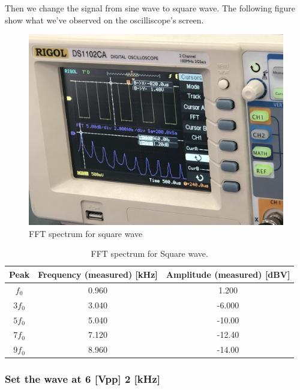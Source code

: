 \documentclass{article}
\begin{document}
Then we change the signal from sine wave to square wave. The following figure show what we've observed on the oscilliscope's screen.
  \begin{figure}[H]
  \centering
  \includegraphics[width=.6\textwidth]{Figure6.jpg}
  \caption{FFT spectrum for square wave}
  \label{img} 
\end{figure}

\begin{table}[H]

\begin{center}

\begin{tabular}{|c|c|c|}

\hline

Peak & Frequency (measured) [kHz] & Amplitude (measured) [dBV] \\

\hline

$f_0$  &	0.960	&	1.200	\\

\hline

$3f_0$ &	3.040	&	-6.000	\\

\hline

$5f_0$ &	5.040	&	-10.00	\\

\hline

$7f_0$ &	7.120	&	-12.40	\\

\hline

$9f_0$ &	8.960	&	-14.00	\\
\hline
\end{tabular}
\caption{FFT spectrum for Square wave.}
\label{tab-3}
\end{center}
\end{table}

\subsubsection{Set the wave at 6 [Vpp] 2 [kHz]}
\end{document}
